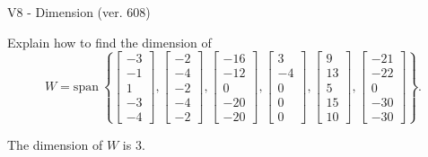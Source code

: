 \begin{exercise}
  \begin{exerciseTitle}V8 - Dimension (ver. 608)\end{exerciseTitle}
  \begin{exerciseStatement}
    Explain how to find the dimension of 
\[W=\mathrm{span}\ \left\{\left[\begin{array}{r}
-3 \\
-1 \\
1 \\
-3 \\
-4
\end{array}\right] , \left[\begin{array}{r}
-2 \\
-4 \\
-2 \\
-4 \\
-2
\end{array}\right] , \left[\begin{array}{r}
-16 \\
-12 \\
0 \\
-20 \\
-20
\end{array}\right] , \left[\begin{array}{r}
3 \\
-4 \\
0 \\
0 \\
0
\end{array}\right] , \left[\begin{array}{r}
9 \\
13 \\
5 \\
15 \\
10
\end{array}\right] , \left[\begin{array}{r}
-21 \\
-22 \\
0 \\
-30 \\
-30
\end{array}\right]\right\}.\]



  \end{exerciseStatement}
  \begin{exerciseAnswer}
   The dimension of \(W\) is  \(3\).
  


  \end{exerciseAnswer}
\end{exercise}